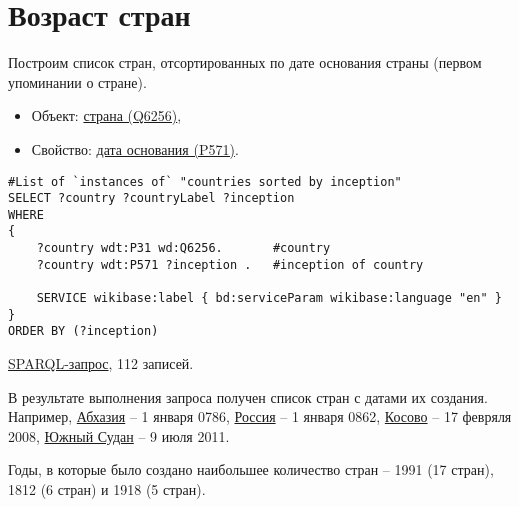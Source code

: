 \section{Возраст стран}

Построим список стран, отсортированных по дате основания страны (первом упоминании о стране).

\begin{itemize}
    \item Объект: \href{https://www.wikidata.org/wiki/Q6256}{страна (Q6256)},
    \item Свойство: \href{https://www.wikidata.org/wiki/Property:P571}{дата основания (P571)}.
\end{itemize}

\begin{lstlisting}[language=SPARQL label=countryinception, caption=Список стран упорядоченных по дате создания]
#List of `instances of` "countries sorted by inception" 
SELECT ?country ?countryLabel ?inception
WHERE
{
    ?country wdt:P31 wd:Q6256.       #country
    ?country wdt:P571 ?inception .   #inception of country
    
    SERVICE wikibase:label { bd:serviceParam wikibase:language "en" }
}
ORDER BY (?inception)
\end{lstlisting}


\href{https://query.wikidata.org/#%23List%20of%20%60instances%20of%60%20%22countries%20sorted%20by%20inception%22%20%0ASELECT%20%3Fcountry%20%3FcountryLabel%20%3Finception%0AWHERE%0A%7B%0A%20%20%20%20%3Fcountry%20wdt%3AP31%20wd%3AQ6256.%0A%20%20%20%20%3Fcountry%20wdt%3AP571%20%3Finception%20.%0A%20%20%20%20%0A%20%20%20%20SERVICE%20wikibase%3Alabel%20%7B%20bd%3AserviceParam%20wikibase%3Alanguage%20%22en%22%20%7D%0A%7D%0A%0AORDER%20BY%20%28%3Finception%29}{SPARQL-запрос}, 112 записей.

В результате выполнения запроса получен список стран с датами их создания. Например, \href{https://www.wikidata.org/wiki/Q23334}{Абхазия} -- 1 января 0786, \href{https://www.wikidata.org/wiki/Q159}{Россия} -- 1 января 0862, \href{https://www.wikidata.org/wiki/Q1246}{Косово} -- 17 февряля 2008, \href{https://www.wikidata.org/wiki/Q958}{Южный Судан} -- 9 июля 2011.

Годы, в которые было создано наибольшее количество стран -- 1991 (17 стран), 1812 (6 стран) и 1918 (5 стран). 